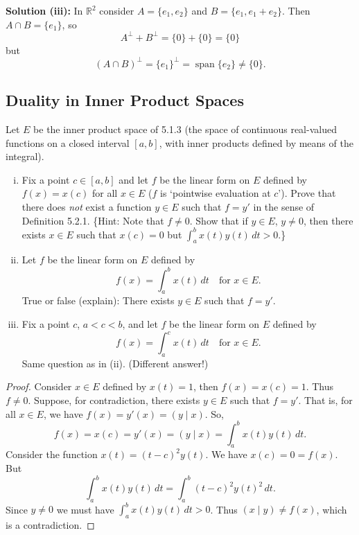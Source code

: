 \textbf{Solution (iii): }
In $\mathbb{R}^2$ consider $A = \{e_1, e_2\}$ and $B = \{e_1, e_1 + e_2\}$.
Then $A \cap B = \{e_1\}$, so
\[A^\perp + B^\perp = \{0\} + \{0\} = \{0\}\]
but 
\[(A \cap B)^\perp = \{e_1\}^\perp = \operatorname{span}\{e_2\} \ne \{0\}.\]

\subsection{Duality in Inner Product Spaces}

\begin{tcolorbox}[title=Problem 1, breakable]
Let $E$ be the inner product space of 5.1.3 (the space of continuous real-valued functions on a closed interval $[a, b]$, with inner products defined by means of the integral).
\begin{enumerate}[(i)]
    \item Fix a point $c \in [a, b]$ and let $f$ be the linear form on $E$ defined by $f(x) = x(c)$ for all $x \in E$ ($f$ is `pointwise evaluation at $c$'). Prove that there does \textit{not} exist a function $y \in E$ such that $f = y'$ in the sense of Definition 5.2.1. \{Hint: Note that $f \neq 0$. Show that if $y \in E$, $y \neq 0$, then there exists $x \in E$ such that $x(c) = 0$ but $\int_a^b x(t)y(t)\,dt > 0$.\}

    \item Let $f$ be the linear form on $E$ defined by
    \[
        f(x) = \int_a^b x(t)\,dt \quad \text{for } x \in E.
    \]
    True or false (explain): There exists $y \in E$ such that $f = y'$.

    \item Fix a point $c$, $a < c < b$, and let $f$ be the linear form on $E$ defined by
    \[
        f(x) = \int_a^c x(t)\,dt \quad \text{for } x \in E.
    \]
    Same question as in (ii). (Different answer!)
\end{enumerate}
\end{tcolorbox}

\begin{proof}
Consider $x \in E$ defined by $x(t) = 1$, then $f(x) = x(c) = 1$.
Thus $f \neq 0$. Suppose, for contradiction, there exists $y \in E$ such
that $f = y'$. That is, for all $x \in E$, we have $f(x) = y'(x) =
(y \mid x)$. So,
\[
    f(x) = x(c) = y'(x) = (y \mid x) = \int_a^b x(t)y(t)\,dt.
\]
Consider the function $x(t) = (t-c)^2 y(t)$. We have $x(c) = 0 = f(x)$.
But
\[
    \int_a^b x(t)y(t)\,dt = \int_a^b (t-c)^2 y(t)^2\,dt.
\]
Since $y \neq 0$ we must have $\int_a^b x(t)y(t)\,dt > 0$. Thus
$(x \mid y) \neq f(x)$, which is a contradiction.
\end{proof}

